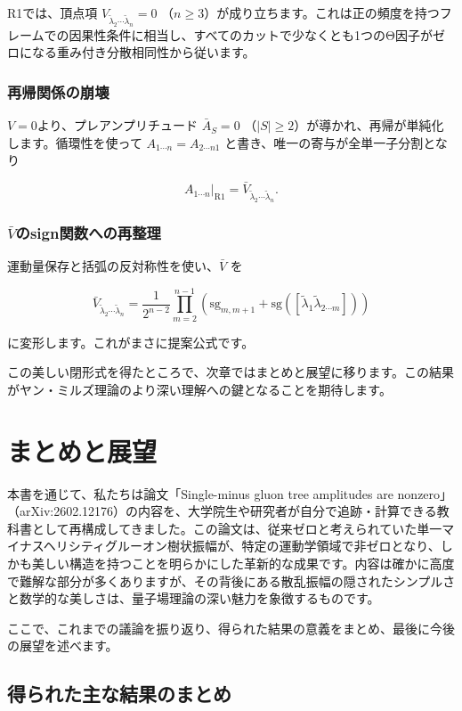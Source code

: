 \documentclass[dvipdfmx,a4paper]{jsbook}
\theoremstyle{definition}
\theoremstyle{remark}
\begin{document}
R1では、頂点項 \(V_{\tilde{\lambda}_2 \cdots \tilde{\lambda}_n} = 0\) （$n \ge 3$）が成り立ちます。これは正の頻度を持つフレームでの因果性条件に相当し、すべてのカットで少なくとも1つのΘ因子がゼロになる重み付き分散相同性から従います。

\subsection{再帰関係の崩壊}

$V=0$より、プレアンプリチュード \(\bar{A}_S = 0\) （$|S| \ge 2$）が導かれ、再帰が単純化します。循環性を使って \(A_{1\cdots n} = A_{2\cdots n1}\) と書き、唯一の寄与が全単一子分割となり

\[
A_{1\cdots n}|_{\text{R1}} = \bar{V}_{\tilde{\lambda}_2 \cdots \tilde{\lambda}_n}.
\]

\subsection{$\bar{V}$のsign関数への再整理}

運動量保存と括弧の反対称性を使い、\(\bar{V}\) を

\[
\bar{V}_{\tilde{\lambda}_2 \cdots \tilde{\lambda}_n} = \frac{1}{2^{n-2}} \prod_{m=2}^{n-1} \left( \mathrm{sg}_{m,m+1} + \mathrm{sg}([\tilde{\lambda}_1 \tilde{\lambda}_{2\cdots m}]) \right)
\]

に変形します。これがまさに提案公式です。

この美しい閉形式を得たところで、次章ではまとめと展望に移ります。この結果がヤン・ミルズ理論のより深い理解への鍵となることを期待します。

\chapter{まとめと展望}

本書を通じて、私たちは論文「Single-minus gluon tree amplitudes are nonzero」（arXiv:2602.12176）の内容を、大学院生や研究者が自分で追跡・計算できる教科書として再構成してきました。この論文は、従来ゼロと考えられていた単一マイナスヘリシティグルーオン樹状振幅が、特定の運動学領域で非ゼロとなり、しかも美しい構造を持つことを明らかにした革新的な成果です。内容は確かに高度で難解な部分が多くありますが、その背後にある散乱振幅の隠されたシンプルさと数学的な美しさは、量子場理論の深い魅力を象徴するものです。

ここで、これまでの議論を振り返り、得られた結果の意義をまとめ、最後に今後の展望を述べます。

\section{得られた主な結果のまとめ}
\end{document}
